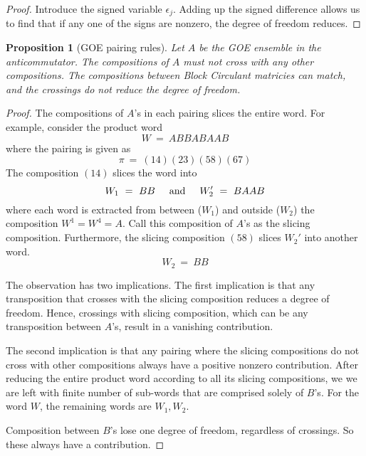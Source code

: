 \documentclass{article}
\newcommand{\textAnd}{
    {
        \hspace{5mm}
        \textrm{and}
        \hspace{5mm}
    }
}
\newtheorem{prop}{Proposition}
\begin{document}
\begin{proof}
    Introduce the signed variable $\epsilon_j$. Adding 
    up the signed difference allows us to find 
    that if any one of the signs are nonzero, the 
    degree of freedom reduces. 
\end{proof}

\begin{prop} [GOE pairing rules]
    Let $A$ be the GOE ensemble in the anticommutator. 
    The compositions of $A$ must not cross with any other 
    compositions. The compositions between Block 
    Circulant matricies can match, and the crossings 
    do not reduce the degree of freedom. 
\end{prop}
\begin{proof}
    The compositions of $A$'s in each pairing slices 
    the entire word. For example, consider the product word 
    \[
        W \ = \ ABBABAAB
    \]
    where the pairing is given as 
    \[
        \pi \ = \ (1 4)(2 3)(5 8) (6 7)
    \]
    The composition $(14)$ slices the word into 
    \[
        W_1 \ = \ BB 
        \textAnd 
        W_2' \ = \ BAAB 
    \]
    where each word is extracted from between ($W_1$) and 
    outside ($W_2$) the composition $W^1 = W^4 = A$. Call 
    this composition of $A$'s as the slicing composition.
    Furthermore, the slicing composition $(58)$ slices $W_2'$ 
    into another word. 
    \[
        W_2 \ = \ BB
    \]

    The observation has two implications. The first implication 
    is that any transposition that crosses with the slicing 
    composition reduces a degree of freedom. Hence, crossings 
    with slicing composition, which can be any transposition between $A$'s, 
    result in a vanishing contribution. 

    The second implication is that any pairing where the 
    slicing compositions do not cross with other compositions 
    always have a positive nonzero contribution. After reducing the entire 
    product word according to all its slicing compositions, we 
    we are left with finite number of sub-words that are comprised solely 
    of $B$'s. For the word $W$, the remaining words are $W_1, W_2$. 

    Composition between $B$'s lose one degree of freedom, regardless of 
    crossings. So these always have a contribution.
\end{proof}
\end{document}
